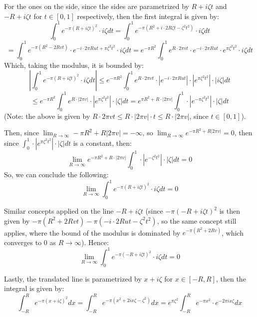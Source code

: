 \documentclass{article}
\begin{document}
\begin{itemize}
    For the ones on the side, since the sides are parametrized by $R+i\zeta t$ and $-R+i\zeta t$ for $t\in[0,1]$ respectively, then the first integral is given by:
    $$\int_{0}^{1}e^{-\pi(R+i\zeta t)^2}\cdot i\zeta dt = \int_{0}^{1}e^{-\pi(R^2+i\cdot 2R\zeta t-\zeta^2t^2)}\cdot i\zeta dt$$
    $$=\int_{0}^{1}e^{-\pi(R^2-2Rvt)}\cdot e^{-i\cdot 2\pi Rut+\pi\zeta^2t^2}\cdot i\zeta dt=e^{-\pi R^2}\int_{0}^{1}e^{R\cdot 2\pi vt}\cdot e^{-i\cdot 2\pi Rut}\cdot e^{\pi\zeta^2t^2}\cdot i\zeta dt$$
    Which, taking the modulus, it is bounded by:
    $$\left|\int_{0}^{1}e^{-\pi(R+i\zeta t)^2}\cdot i\zeta dt\right| \leq e^{-\pi R^2}\int_{0}^{1}e^{R\cdot 2\pi vt}\cdot |e^{-i\cdot 2\pi Rut}|\cdot |e^{\pi\zeta^2t^2}|\cdot |i\zeta| dt$$
    $$\leq e^{-\pi R^2}\int_{0}^{1}e^{R\cdot |2\pi v|}\cdot |e^{\pi\zeta^2t^2}|\cdot |\zeta| dt = e^{\pi R^2+R\cdot |2\pi v|}\int_{0}^{1}\cdot |e^{-\pi \zeta^2t^2}|\cdot |\zeta| dt$$
    (Note: the above is given by $R\cdot 2\pi vt \leq R\cdot |2\pi v|\cdot t \leq R\cdot|2\pi v|$, since $t\in [0,1]$).

    Then, since $\lim_{R\rightarrow\infty}-\pi R^2+R|2\pi v| = -\infty$, so $\lim_{R\rightarrow\infty}e^{-\pi R^2+R|2\pi v|}=0$, then since $\int_{0}^{1}\cdot |e^{\pi\zeta^2t^2}|\cdot |\zeta| dt$ is a constant, then:
    $$\lim_{R\rightarrow\infty}e^{-\pi R^2+R\cdot |2\pi v|}\int_{0}^{1}\cdot |e^{-\zeta^2t^2}|\cdot |\zeta| dt = 0$$
    So, we can conclude the following:
    $$\lim_{R\rightarrow\infty}\int_{0}^{1}e^{-\pi(R+i\zeta t)^2}\cdot i\zeta dt = 0$$

    Similar concepts applied on the line $-R+i\zeta t$ (since $-\pi(-R+i\zeta t)^2$ is then given by $-\pi(R^2+2Rvt)-\pi(-i\cdot 2Rut-\zeta^2t^2)$, so the same concept still applies, where the bound of the modulus is dominated by $e^{-\pi(R^2+2Rv)}$, 
    which converges to $0$ as $R\rightarrow\infty$). Hence: 
    $$\lim_{R\rightarrow\infty}\int_{0}^{1}e^{-\pi(-R+i\zeta t)^2}\cdot i\zeta dt = 0$$

    \hfil

    Lastly, the translated line is parametrized by $x+i\zeta$ for $x\in [-R,R]$, then the integral is given by:
    $$\int_{-R}^{R}e^{-\pi(x+i\zeta)^2}dx = \int_{-R}^{R}e^{-\pi(x^2+2ix\zeta - \zeta^2)}dx = e^{\pi\zeta^2}\int_{-R}^{R}e^{-\pi x^2}\cdot e^{-2\pi ix\zeta}dx$$
    
    \hfil


\end{itemize}
\end{document}
